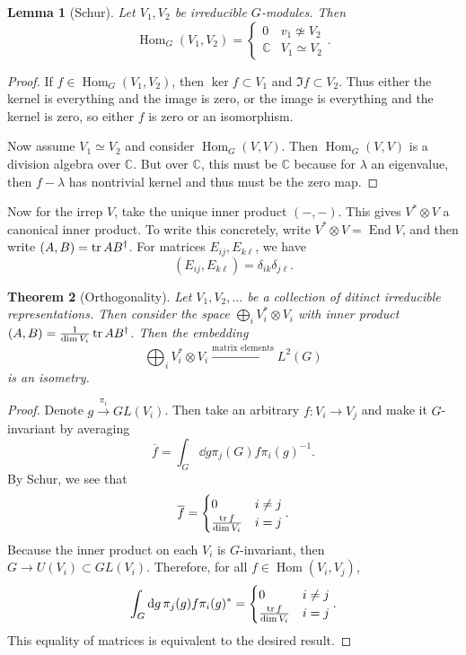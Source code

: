 \documentclass[leqno, openany]{memoir}
\newtheorem{thm}{Theorem}[section]
\newtheorem{lem}[thm]{Lemma}
\theoremstyle{definition}
\theoremstyle{remark}
\theoremstyle{plain}
\theoremstyle{definition}
\theoremstyle{remark}
\newcommand{\C}{\mathbb{C}}
\newcommand{\ol}[1]{\overline{#1}}
\DeclareMathOperator{\Hom}{Hom}
\DeclareMathOperator{\End}{End}
\begin{document}
\begin{lem}[Schur]
    Let $V_1, V_2$ be irreducible $G$-modules. Then
    \[ \Hom_G(V_1, V_2) = \begin{cases}
        0 & v_1 \not\simeq V_2 \\
        \C & V_1 \simeq V_2
    \end{cases}. \]
\end{lem}

\begin{proof}
    If $f \in \Hom_G(V_1, V_2)$, then $\ker f \subset V_1$ and $\Im f \subset V_2$. Thus either the kernel is everything and the image is zero, or the image is everything and the kernel is zero, so either $f$ is zero or an isomorphism.

    Now assume $V_1 \simeq V_2$ and consider $\Hom_G(V,V)$. Then $\Hom_G(V,V)$ is a division algebra over $\C$. But over $\C$, this must be $\C$ because for $\lambda$ an eigenvalue, then $f-\lambda$ has nontrivial kernel and thus must be the zero map.
\end{proof}

Now for the irrep $V$, take the unique inner product $(-,-)$. This gives $V^* \otimes V$ a canonical inner product. To write this concretely, write $V^* \otimes V = \End V$, and then write $(A,B) = \tr AB^{\dag}$. For matrices $E_{ij}, E_{k\ell}$, we have
\[ (E_{ij}, E_{k\ell}) = \delta_{ik} \delta_{j\ell}. \]

\begin{thm}[Orthogonality]
    Let $V_1, V_2, \ldots$ be a collection of ditinct irreducible representations. Then consider the space $\bigoplus_i V_i^* \otimes V_i$ with inner product $(A,B) = \frac{1}{\dim V_i} \tr AB^{\dag}$. Then the embedding
    \[ \bigoplus_i V_i^* \otimes V_i \xrightarrow{\text{matrix elements}} L^2(G) \]
    is an isometry.
\end{thm}

\begin{proof}
    Denote $g \xrightarrow{\pi_i} GL(V_i)$. Then take an arbitrary $f \colon V_i \to V_j$ and make it $G$-invariant by averaging
    \[ \ol{f} = \int_G \dd{g} \pi_j(G) f \pi_i{ (g) }^{-1}. \]
    By Schur, we see that
    \[ \ol{f} = \begin{cases}
        0 & i \neq j \\
        \frac{\tr f}{\dim V_i} & i = j
    \end{cases}. \]
    Because the inner product on each $V_i$ is $G$-invariant, then $G \to U(V_i) \subset GL(V_i)$. Therefore, for all $f \in \Hom(V_i, V_j)$, 
    \[ \int_G \dd{g} \pi_j(g) f \pi_i(g)^* = \begin{cases}
        0 & i \neq j \\
        \frac{\tr f}{\dim V_i} & i = j
    \end{cases}. \]
    This equality of matrices is equivalent to the desired result.
\end{proof}
\end{document}
